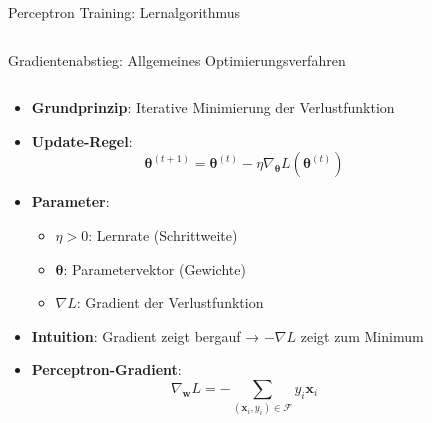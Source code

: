 \documentclass[aspectratio=1610, xcolor=dvipsnames, 9pt]{beamer}
\begin{document}
\begin{frame}{Perceptron Training: Lernalgorithmus}
\begin{columns}
\begin{column}{0.3\textwidth}
          \end{column}
        \end{columns}
      \end{frame}

      \begin{frame}{Gradientenabstieg: Allgemeines Optimierungsverfahren}
        \begin{columns}
          \begin{column}{0.7\textwidth}
            \begin{itemize}
              \item \textbf{Grundprinzip}: Iterative Minimierung der Verlustfunktion
              \item \textbf{Update-Regel}:
              \begin{equation}
                \boldsymbol{\theta}^{(t+1)} = \boldsymbol{\theta}^{(t)} - \eta \nabla_{\boldsymbol{\theta}} L(\boldsymbol{\theta}^{(t)})
              \end{equation}
              \item \textbf{Parameter}:
              \begin{itemize}
                \item $\eta > 0$: Lernrate (Schrittweite)
                \item $\boldsymbol{\theta}$: Parametervektor (Gewichte)
                \item $\nabla L$: Gradient der Verlustfunktion
              \end{itemize}
              \item \textbf{Intuition}: Gradient zeigt bergauf → $-\nabla L$ zeigt zum Minimum
              \item \textbf{Perceptron-Gradient}:
              \begin{equation}
                \nabla_{\mathbf{w}} L = -\sum_{(\mathbf{x}_i, y_i) \in \mathcal{F}} y_i \mathbf{x}_i
              \end{equation}
            \end{itemize}
          \end{column}
          \begin{column}{0.3\textwidth}
            \centering

\end{column}
\end{columns}
\end{frame}
\end{document}
